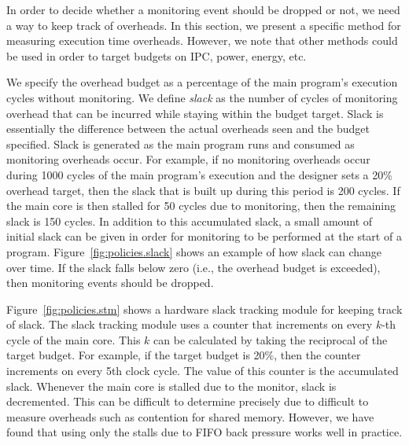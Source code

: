 In order to decide whether a monitoring event should be dropped or not, we need
a way to keep track of overheads. In this section, we present a specific method
for measuring execution time overheads. However, we note that other methods
could be used in order to target budgets on IPC, power, energy, etc.  

We specify the overhead budget as a percentage of the main program's execution
cycles without monitoring. We define \emph{slack} as the number of cycles of
monitoring overhead that can be incurred while staying within the budget
target. Slack is essentially the difference between the actual overheads seen
and the budget specified. Slack is generated as the main program runs and consumed as monitoring overheads occur.  For
example, if no monitoring overheads occur during 1000 cycles of the main
program's execution and the designer sets a 20\% overhead target, then the
slack that is built up during this period is 200 cycles. If the main core is
then stalled for 50 cycles due to monitoring, then the remaining slack is 150
cycles. 
In addition to this accumulated slack, a small amount of initial slack
can be given in order for monitoring to be performed at the start of a program.
Figure~\ref{fig:policies.slack} shows an example of how slack can change over time.
If the slack falls below zero (i.e., the overhead budget is exceeded), then
monitoring events should be dropped.

Figure~\ref{fig:policies.stm} shows a hardware slack tracking module for
keeping track of slack. The slack tracking module uses a counter that increments on every $k$-th
cycle of the main core. This $k$ can be calculated by taking the reciprocal of
the target budget. For example, if the target budget is 20\%, then the counter
increments on every 5th clock cycle. The value of this counter is the
accumulated slack. Whenever the main core is stalled due to the monitor, slack
is decremented. This can be difficult to determine precisely due to difficult
to measure overheads such as contention for shared memory. However, we have
found that using only the stalls due to FIFO back pressure works well in
practice.

